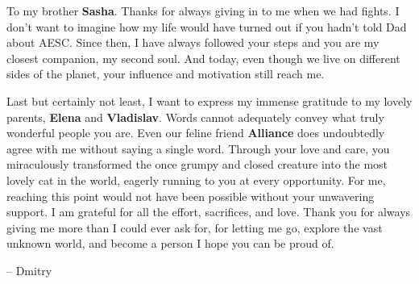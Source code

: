 To my brother \textbf{Sasha}. Thanks for always giving in to me when we had fights.
I don't want to imagine how my life would have turned out if you hadn't told Dad about AESC.
Since then, I have always followed your steps and you are my closest companion, my second soul.
And today, even though we live on different sides of the planet, your influence and motivation still reach me.

Last but certainly not least, I want to express my immense gratitude to my lovely parents, \textbf{Elena} and \textbf{Vladislav}.
Words cannot adequately convey what truly wonderful people you are.
Even our feline friend \textbf{Alliance} does undoubtedly agree with me without saying a single word. 
Through your love and care, you miraculously transformed the once grumpy and closed creature
into the most lovely cat in the world, eagerly running to you at every opportunity.
For me, reaching this point would not have been possible without your unwavering support. 
I am grateful for all the effort, sacrifices, and love.
Thank you for always giving me more than I could ever ask for, 
for letting me go, explore the vast unknown world, and become a person I hope you can be proud of.



\begin{flushright}
-- Dmitry
\end{flushright}

